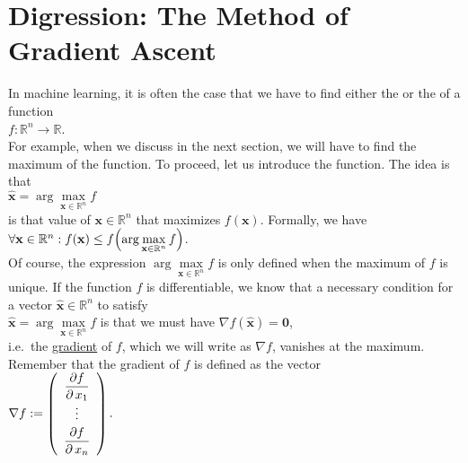 \section{Digression: The Method of Gradient Ascent \label{section:gradient-ascent}}
In machine learning, it is often the case that we have to find either the  or the 
of a function 
\\[0.2cm]
\hspace*{1.3cm}
$f: \mathbb{R}^n \rightarrow \mathbb{R}$.
\\[0.2cm]
For example, when we discuss  in the next section, we will have to find the maximum
of the  function.  To proceed, let us introduce the \blue{$\arg\max$} function.
 The idea is that
\\[0.2cm]
\hspace*{1.3cm}
$\mathbf{\widehat{x}} = \arg\max\limits_{\mathbf{x}\in \mathbb{R}^n} f$
\\[0.2cm]
is that value of $\mathbf{x} \in \mathbb{R}^n$ that maximizes $ f(\mathbf{x})$.  Formally, we have
\\[0.2cm]
\hspace*{1.3cm}
$\forall \mathbf{x} \in \mathbb{R}^n : f(\mathbf{x}) \leq f\Bigl(\arg\max\limits_{\mathbf{x}\in \mathbb{R}^n} f\Bigr)$.
\\[0.2cm]
Of course, the expression $\arg\max\limits_{\mathbf{x}\in \mathbb{R}^n} f$ is only defined when the maximum of
$f$ is unique.  If the function $f$ is differentiable, we know that a necessary condition for a vector
$\mathbf{\widehat{x}} \in \mathbb{R}^n$ to satisfy
\\[0.2cm]
\hspace*{1.3cm}
$\mathbf{\widehat{x}} = \arg\max\limits_{\mathbf{x}\in \mathbb{R}^n} f$ \quad is that we must have \quad $\nabla f(\mathbf{\widehat{x}}) = \mathbf{0}$,
\\[0.2cm]
i.e.~the \href{https://en.wikipedia.org/wiki/Gradient}{gradient} of $f$, which we will write as $\nabla f$,
vanishes at the maximum.  Remember that the gradient of $f$ is defined as the vector
\\[0.2cm]
\hspace*{1.3cm}
$\nabla f := \left(
 \begin{array}{c}
 \displaystyle\frac{\partial f}{\partial\, x_1} \\
    \vdots                            \\[0.1cm]
 \displaystyle\frac{\partial f}{\partial\, x_n} \\ 
 \end{array}
 \right).
$
\vspace*{0.2cm}

